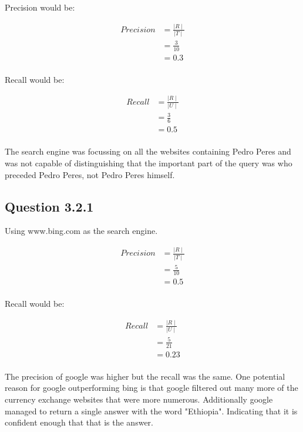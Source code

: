 \documentclass[10pt,a4paper]{article}
\begin{document}
Precision would be:

\begin{equation}
\begin{split}
Precision &= \frac{\mid R \mid}{\mid T \mid} \\
&= \frac{3}{10}\\
&=0.3\\ 
\end{split}
\end{equation}

Recall would be:

\begin{equation}
\begin{split}
Recall &= \frac{\mid R \mid}{\mid U \mid} \\ 
&= \frac{3}{6} \\
&= 0.5 \\
\end{split}
\end{equation}

The search engine was focussing on all the websites containing Pedro Peres and was not capable of distinguishing that the important part of the query was who preceded Pedro Peres, not Pedro Peres himself.

\subsection{Question 3.2.1}

Using www.bing.com as the search engine.

\begin{equation}
\begin{split}
Precision &= \frac{\mid R \mid}{\mid T \mid} \\
&= \frac{5}{10}\\
&=0.5\\ 
\end{split}
\end{equation}

Recall would be:

\begin{equation}
\begin{split}
Recall &= \frac{\mid R \mid}{\mid U \mid} \\ 
&= \frac{5}{21} \\
&= 0.23 \\
\end{split}
\end{equation}

The precision of google was higher but the recall was the same. One potential reason for google outperforming bing is that google filtered out  many more of the currency exchange websites that were more numerous. Additionally google managed to return a single answer with the word "Ethiopia". Indicating that it is confident enough that that is the answer.
\end{document}
